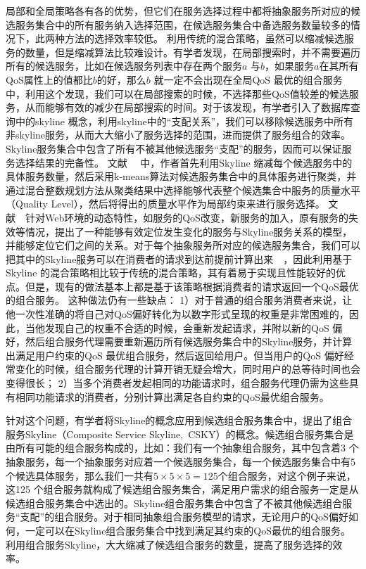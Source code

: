 局部和全局策略各有各的优势，但它们在服务选择过程中都将抽象服务所对应的候选服务集合中的所有服务纳入选择范围，在候选服务集合中备选服务数量较多的情况下，此两种方法的选择效率较低。
利用传统的混合策略，虽然可以缩减候选服务的数量，但是缩减算法比较难设计。有学者发现，在局部搜索时，并不需要遍历所有的候选服务，比如在候选服务列表中存在两个服务$a$ 与$b$，如果服务$a$在其所有QoS属性上的值都比$b$的好，那么$b$ 就一定不会出现在全局QoS 最优的组合服务中，利用这个发现，我们可以在局部搜索的时候，不选择那些QoS值较差的候选服务，从而能够有效的减少在局部搜索的时间。对于该发现，有学者引入了数据库查询中的skyline 概念，利用skyline中的``支配关系''，我们可以移除候选服务中所有非skyline服务，从而大大缩小了服务选择的范围，进而提供了服务组合的效率。Skyline服务集合中包含了所有不被其他候选服务``支配''的服务，因而可以保证服务选择结果的完备性。
文献~\cite{alrifai2010selecting}~ 中，作者首先利用Skyline 缩减每个候选服务中的具体服务数量，然后采用k-means算法对候选服务集合中的具体服务进行聚类，并通过混合整数规划方法从聚类结果中选择能够代表整个候选集合中服务的质量水平（Quality Level），然后将得出的质量水平作为局部约束来进行服务选择。
文献~\cite{jwu2010skyline}~针对Web环境的动态特性，如服务的QoS改变，新服务的加入，原有服务的失效等情况，提出了一种能够有效定位发生变化的服务与Skyline服务关系的模型，并能够定位它们之间的关系。对于每个抽象服务所对应的候选服务集合，我们可以把其中的Skyline服务可以在消费者的请求到达前提前计算出来~\cite{alrifai2010selecting}~，因此利用基于Skyline 的混合策略相比较于传统的混合策略，其有着易于实现且性能较好的优点。但是，现有的做法基本上都是基于该策略根据消费者的请求返回一个QoS最优的组合服务。
这种做法仍有一些缺点：
1）对于普通的组合服务消费者来说，让他一次性准确的将自己对QoS偏好转化为以数字形式呈现的权重是非常困难的，因此，当他发现自己的权重不合适的时候，会重新发起请求，并附以新的QoS 偏好，然后组合服务代理需要重新遍历所有候选服务集合中的Skyline服务，并计算出满足用户约束的QoS 最优组合服务，然后返回给用户。但当用户的QoS 偏好经常变化的时候，组合服务代理的计算开销无疑会增大，同时用户的总等待时间也会变得很长；
2）当多个消费者发起相同的功能请求时，组合服务代理仍需为这些具有相同功能请求的消费者，分别计算出满足各自约束的QoS最优组合服务。

针对这个问题，有学者将Skyline的概念应用到候选组合服务集合中，提出了组合服务Skyline（Composite Service Skyline,~CSKY）的概念。候选组合服务集合是由所有可能的组合服务构成的，比如：我们有一个抽象组合服务，其中包含着3 个抽象服务，每一个抽象服务对应着一个候选服务集合，每一个候选服务集合中有5 个候选具体服务，那么我们一共有$5\times 5\times 5=125$个组合服务，对这个例子来说，这125 个组合服务就构成了候选组合服务集合，满足用户需求的组合服务一定是从候选组合服务集合中选出的。Skyline组合服务集合中包含了不被其他候选组合服务``支配''的组合服务。对于相同抽象组合服务模型的请求，无论用户的QoS偏好如何，一定可以在Skyline组合服务集合中找到满足其约束的QoS最优的组合服务。利用组合服务Skyline，大大缩减了候选组合服务的数量，提高了服务选择的效率。

